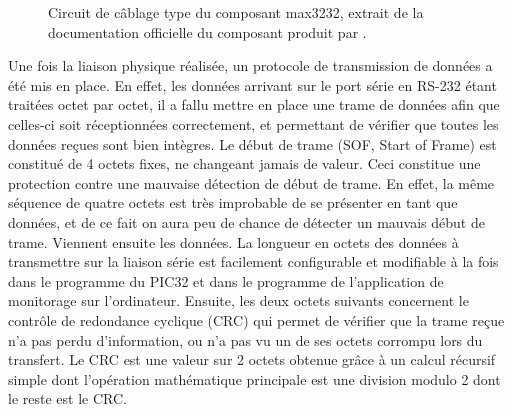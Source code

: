 \documentclass[letterpaper, twoside, 12pt, memoire, creativecommons, hyperref]{thETS}
\begin{document}
\begin{figure}
	\centering
	\caption{Circuit de câblage type du composant max3232, extrait de la documentation officielle du composant produit par \cite{MAXIM3232}.}
	\label{fig:max3232}
\end{figure}

Une fois la liaison physique réalisée, un protocole de transmission de données a été mis en place. En effet, les données arrivant sur le port série en RS-232 étant traitées octet par octet, il a fallu mettre en place une trame de données afin que celles-ci soit réceptionnées correctement, et permettant de vérifier que toutes les données reçues sont bien intègres.
Le début de trame (SOF, Start of Frame) est constitué de 4 octets fixes, ne changeant jamais de valeur. Ceci constitue une protection contre une mauvaise détection de début de trame. En effet, la même séquence de quatre octets est très improbable de se présenter en tant que données, et de ce fait on aura peu de chance de détecter un mauvais début de trame. Viennent ensuite les données. La longueur en octets des données à transmettre sur la liaison série est facilement configurable et modifiable à la fois dans le programme du PIC32 et dans le programme de l'application de monitorage sur l'ordinateur.
Ensuite, les deux octets suivants concernent le contrôle de redondance cyclique (CRC) qui permet de vérifier que la trame reçue n'a pas perdu d'information, ou n'a pas vu un de ses octets corrompu lors du transfert. Le CRC est une valeur sur 2 octets obtenue grâce à un calcul récursif simple dont l'opération mathématique principale est une division modulo 2 dont le reste est le CRC. %
\end{document}
